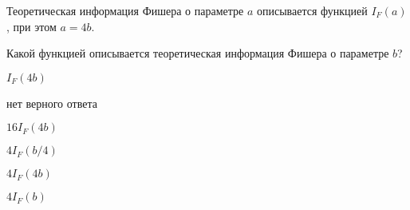 
\begin{question}
Теоретическая информация Фишера о параметре \(a\) описывается функцией
\(I_F(a)\), при этом \(a = 4b\).

Какой функцией описывается теоретическая информация Фишера о параметре
\(b\)?
\begin{answerlist}
  \item \(I_F(4 b)\)
  \item нет верного ответа
  \item \(16 I_F(4 b)\)
  \item \(4 I_F(b/4)\)
  \item \(4 I_F(4 b)\)
  \item \(4 I_F(b)\)
\end{answerlist}
\end{question}


